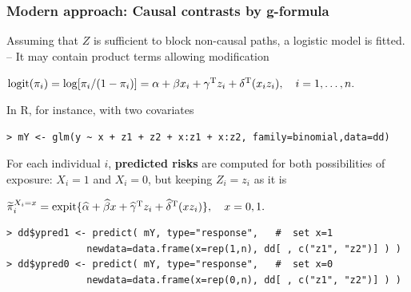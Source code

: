 \documentclass[12pt,dvipsnames,t,aspectratio=169, handout%
]{beamer}
\begin{document}
\begin{frame}[fragile]
\frametitle{\large Modern approach: Causal contrasts by g-formula}

\bi
\item
Assuming that $Z$ is sufficient to block non-causal paths, 
a logistic model is fitted. -- 
It may contain product terms allowing modification
\begin{center}
$ \text{logit}(\pi_i) = \log[\pi_i/(1-\pi_i)] = 
\alpha + \beta x_i + \gamma^{\small\text{T}} z_i + \delta^{\small\text{T}} (x_i z_i), \quad i=1, \dots, n. $
\end{center}
\medskip
\item
In R, for instance, with two covariates
{\small \color{blue}
\begin{verbatim}
> mY <- glm(y ~ x + z1 + z2 + x:z1 + x:z2, family=binomial,data=dd)
\end{verbatim}
}
\pause
\medskip
\item
For each individual $i$, \textbf{predicted risks} are computed
for both possibilities of exposure: $X_i=1$ and $X_i=0$, but keeping $Z_i=z_i$ as it is
\begin{center}
$ \widetilde{\pi}_i^{X_i=x} = \text{expit}\{ \widehat\alpha + \widehat\beta x + 
   \widehat\gamma^{\small\text{T}} z_i + \widehat\delta^{\small\text{T}} (x z_i)\}, \quad x=0,1 .  $
\end{center}
{\small \color{blue}
\begin{verbatim}
> dd$ypred1 <- predict( mY, type="response",   #  set x=1
              newdata=data.frame(x=rep(1,n), dd[ , c("z1", "z2")] ) )
> dd$ypred0 <- predict( mY, type="response",   #  set x=0
              newdata=data.frame(x=rep(0,n), dd[ , c("z1", "z2")] ) )          
\end{verbatim}
}
\ei
\end{frame}
\end{document}
